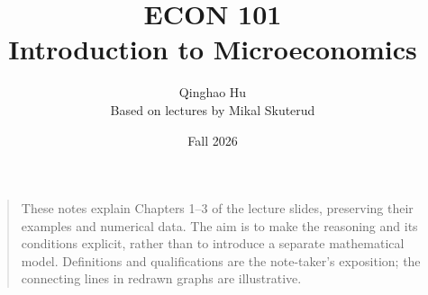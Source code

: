 \documentclass[11pt,latinmodern]{article}
\title{\textbf{ECON 101}\\[0.5em]\large Introduction to Microeconomics}
\author{Qinghao Hu\\\small Based on lectures by Mikal Skuterud}
\date{Fall 2026}
\begin{document}
\raggedbottom
\maketitle
\begin{quote}\small
These notes explain Chapters 1--3 of the lecture slides, preserving their
examples and numerical data. The aim is to make the reasoning and its
conditions explicit, rather than to introduce a separate mathematical
model. Definitions and qualifications are the note-taker's exposition;
the connecting lines in redrawn graphs are illustrative.
\end{quote}
\tableofcontents



\printindex
\end{document}
